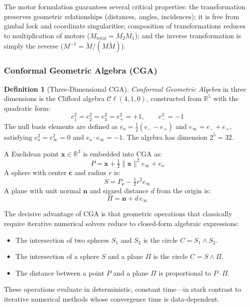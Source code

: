 \documentclass[manuscript, nonacm, review=false]{acmart}
\theoremstyle{definition}
\newtheorem{definition}{Definition}[section]
\theoremstyle{plain}
\newcommand{\R}{\mathbb{R}}
\newcommand{\Cl}{\mathcal{C}\!\ell}
\begin{document}
The motor formulation guarantees several critical properties: the transformation preserves geometric relationships (distances, angles, incidences); it is free from gimbal lock and coordinate singularities; composition of transformations reduces to multiplication of motors ($M_{\text{total}} = M_2 M_1$); and the inverse transformation is simply the reverse ($M^{-1} = \widetilde{M} / (M\widetilde{M})$).


\subsubsection{Conformal Geometric Algebra (CGA)}

\begin{definition}[Three-Dimensional CGA]
\label{def:cga}
\emph{Conformal Geometric Algebra} in three dimensions is the Clifford algebra $\Cl(4,1,0)$, constructed from $\R^5$ with the quadratic form:
\begin{equation}
    e_1^2 = e_2^2 = e_3^2 = e_+^2 = +1, \qquad e_-^2 = -1
\end{equation}
The null basis elements are defined as $e_o = \frac{1}{2}(e_- - e_+)$ and $e_\infty = e_- + e_+$, satisfying $e_o^2 = e_\infty^2 = 0$ and $e_o \cdot e_\infty = -1$. The algebra has dimension $2^5 = 32$.

A Euclidean point $\mathbf{x} \in \R^3$ is embedded into CGA as:
\begin{equation}
    P = \mathbf{x} + \tfrac{1}{2}\|\mathbf{x}\|^2 e_\infty + e_o
    \label{eq:cga_point}
\end{equation}
A sphere with center $\mathbf{c}$ and radius $r$ is:
\begin{equation}
    S = P_{\mathbf{c}} - \tfrac{1}{2}r^2 e_\infty
    \label{eq:cga_sphere}
\end{equation}
A plane with unit normal $\mathbf{n}$ and signed distance $d$ from the origin is:
\begin{equation}
    \Pi = \mathbf{n} + d\, e_\infty
    \label{eq:cga_plane}
\end{equation}
\end{definition}

The decisive advantage of CGA is that geometric operations that classically require iterative numerical solvers reduce to closed-form algebraic expressions:
\begin{itemize}
    \item The intersection of two spheres $S_1$ and $S_2$ is the circle $C = S_1 \wedge S_2$.
    \item The intersection of a sphere $S$ and a plane $\Pi$ is the circle $C = S \wedge \Pi$.
    \item The distance between a point $P$ and a plane $\Pi$ is proportional to $P \cdot \Pi$.
\end{itemize}
These operations evaluate in deterministic, constant time---in stark contrast to iterative numerical methods whose convergence time is data-dependent.
\end{document}
